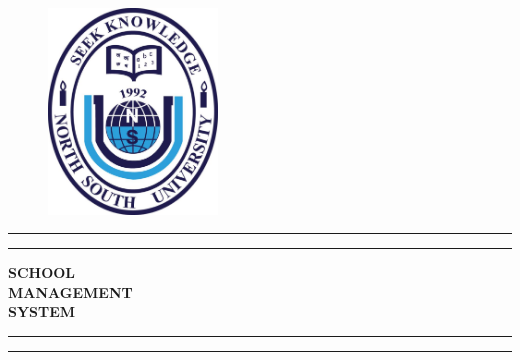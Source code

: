 \documentclass[a4paper,12pt]{article}
\begin{document}
\begin{figure}
    \centering
\includegraphics[width=4.5cm]{logo.jpg}    
\end{figure}

\begin{titlepage} %

	\centering %
	
	\scshape %
	
	\vspace*{\baselineskip} %
	
	
	{\color{blue} \rule{\textwidth}{1.6pt}\vspace*{-\baselineskip}\vspace*{2pt} }%
	{\color{blue} \rule{\textwidth}{0.4pt} } %
	
	\vspace{0.75\baselineskip} %
	
	{\Large \textbf{SCHOOL\\ MANAGEMENT \\ \vspace{0.25cm} SYSTEM}   } %
	
	\vspace{0.75\baselineskip} %
	
	{\color{blue} \rule{\textwidth}{0.4pt}\vspace*{-\baselineskip}\vspace{3.2pt} }%
	{\color{blue} \rule{\textwidth}{1.6pt} }%
	
	\vspace{2\baselineskip} %
	

\end{titlepage}
\end{document}

